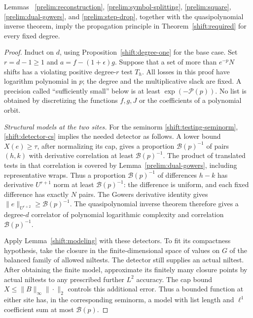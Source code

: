 \begin{proposition}
\label{shift:higher}
Lemmas~
\ref{prelim:reconstruction}, \ref{prelim:symbol-splitting},
\ref{prelim:square}, \ref{prelim:dual-gowers}, and
\ref{prelim:step-drop}, together with the quasipolynomial inverse
theorem, imply the propagation principle in
Theorem~\ref{shift:required} for every fixed degree.
\end{proposition}
\begin{proof}
Induct on $d$, using Proposition~\ref{shift:degree-one} for the
base case.  Set $r=d-1\geq1$ and
$a=f-(1+\epsilon)g$.  Suppose that a set of more than $e^{-p}N$
shifts has a violating positive degree-$r$ test $T_h$.
All losses in this proof have logarithm polynomial in $p$; the
degree and the multiplicative slack are fixed.  A precision called
``sufficiently small'' below is at least $\exp(-\mathcal P(p))$.
No list is obtained by discretizing the functions $f,g,J$ or the
coefficients of a polynomial orbit.

\emph{Structural models at the two sites.}
For the seminorm \eqref{shift:testing-seminorm},
\eqref{shift:detector-cs} implies the needed detector as follows.
A lower bound $X(e)\geq\tau$, after normalizing its cap, gives
a proportion $\mathcal B(p)^{-1}$ of pairs $(h,k)$ with
derivative correlation at least $\mathcal B(p)^{-1}$.
The product of translated tests in that correlation is covered by
Lemma~\ref{prelim:dual-gowers}, including representative wraps.
Thus a proportion $\mathcal B(p)^{-1}$ of differences $h-k$
has derivative $U^{r+1}$ norm at least $\mathcal B(p)^{-1}$:
the difference is uniform, and each fixed difference has exactly
$N$ pairs.  The Gowers derivative identity gives
$\|e\|_{U^{r+2}}\geq\mathcal B(p)^{-1}$.
The quasipolynomial inverse theorem therefore gives a degree-$d$
correlator of polynomial logarithmic complexity and correlation
$\mathcal B(p)^{-1}$.

Apply Lemma~\ref{shift:modeling} with these detectors.  To fit its
compactness hypothesis, take the closure in the finite-dimensional
space of values on $G$ of the balanced family of allowed niltests.
The detector still supplies an actual niltest.  After obtaining the
finite model, approximate its finitely many closure points by
actual niltests to any prescribed further $L^2$ accuracy.
The cap bound $X\leq\|B\|_\infty\|\cdot\|_2$ controls this
additional error.  Thus a bounded function at either site has,
in the corresponding seminorm, a model with list length and
$\ell^1$ coefficient sum at most $\mathcal B(p)$.


\end{proof}
